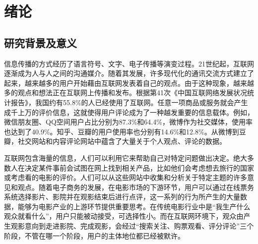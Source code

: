 \documentclass[a4paper,AutoFakeBold,oneside,12pt]{book}
\begin{document}

\newpage
\mbox{}
\thispagestyle{empty}
\newpage


\newpage


\newpage
\mbox{}
\thispagestyle{empty}
\newpage

\newpage


\frontmatter\tableofcontents %

\newpage\mainmatter
{} %
\pagestyle{fancy} %


\chapter{绪论}
\section{研究背景及意义}
信息传播的方式经历了语言符号、文字、电子传播等演变过程。21世纪起，互联网逐渐成为人与人之间的沟通媒介。随着其发展，许多现代化的通讯交流方式建立了起来，越来越多的用户开始藉由互联网发表着自己的观点。由于这种现象，越来越多的观点和想法正在互联网上传播和发布。根据第41次《中国互联网络发展状况统计报告》，我国约有55.8\%的人已经使用了互联网。任意一项商品或服务就会产生成千上万的评价信息，这就使得用户评论成为了一种越发重要的信息载体。例如，微信朋友圈、QQ空间用户占比分别为87.3\%和64.4\%，微博作为社交媒体，使用率也达到了40.9\%。知乎、豆瓣的用户使用率也分别有14.6\%和12.8\%。从微博到豆瓣，社交网站和内容评论网站中蕴含了大量关于个人观点、评论的数据。

互联网包含海量的信息，人们可以利用它来帮助自己对特定问题做出决定。绝大多数人在决定某件事前会试图在网上找到相关产品，比如他们会考虑想去旅行的国家或考虑看的电影的评价。人们可以从这些网站中收集和分析关于特定主题的许多意见和观点。随着电子商务的发展，在电影市场的下游环节，用户可以通过在线票务系统选择影片、影院并在观影结束后进行点评，这一系列的行为所产生的大量数据，能够为电影产业的上游环节提供重要思考。在传统电影行业中是“我生产什么观众就看什么”，用户只能被动接受，可选择性小。而在互联网环境下，观众由产生观影意向到走进影院、完成观影，会经过“搜索关注、购票观看、评分评论”三个阶段，不管在哪一个阶段，用户的主体地位都已经被默许\cite{shenyaoZhongGuoDianYingZaiXianPiaoWuFaZhanYanJiu2016}。
\end{document}
